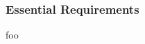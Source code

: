 
\subsubsection{Essential Requirements}
\label{sec:eval_control_flow_analysis_tool_essential_requirements}

foo
